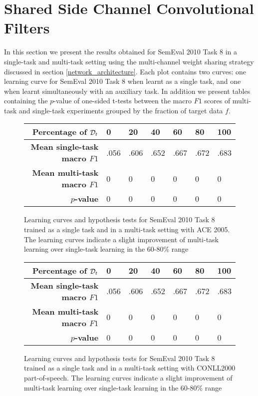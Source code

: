 \section{Shared Side Channel Convolutional Filters}
In this section we present the results obtained for SemEval 2010 Task 8 in a single-task and multi-task setting using the multi-channel weight sharing strategy discussed in section \ref{network_architecture}. Each plot contains two curves: one learning curve for SemEval 2010 Task 8 when learnt as a single task, and one when learnt simultaneously with an auxiliary task. In addition we present tables containing the $p$-value of one-sided t-tests between the macro $F1$ scores of multi-task and single-task experiments grouped by the fraction of target data $f$.
\vspace{2cm}
\begin{figure}[h]
	\centering
	
	
	\vspace*{1cm}
	
	\begin{tabular}{r | l | l | l | l | l | l}
		\textbf{Percentage of $\mathcal{D}_t$} & 0 & 20 & 40 & 60 & 80 & 100 \\  \hline
		\textbf{Mean single-task macro $F1$} & .056 & .606 & .652 & .667 & .672 & .683\\
		\textbf{Mean multi-task macro $F1$} & 0 & 0 & 0 & 0 & 0 & 0\\
		$p$\textbf{-value} & 0 & 0 & 0 & 0 & 0 & 0
	\end{tabular}
	\caption{Learning curves and hypothesis tests for SemEval 2010 Task 8 trained as a single task and in a multi-task setting with ACE 2005. The learning curves indicate a slight improvement of multi-task learning over single-task learning in the 60-80\% range}
\end{figure}
\begin{figure}
	\centering
	
	\vspace*{1cm}
	
	\begin{tabular}{r | l | l | l | l | l | l}
		\textbf{Percentage of $\mathcal{D}_t$} & 0 & 20 & 40 & 60 & 80 & 100 \\  \hline
		\textbf{Mean single-task macro $F1$} & .056 & .606 & .652 & .667 & .672 & .683\\
		\textbf{Mean multi-task macro $F1$} & 0 & 0 & 0 & 0 & 0 & 0\\
		$p$\textbf{-value} & 0 & 0 & 0 & 0 & 0 & 0
	\end{tabular}
	\caption{Learning curves and hypothesis tests for SemEval 2010 Task 8 trained as a single task and in a multi-task setting with CONLL2000 part-of-speech. The learning curves indicate a slight improvement of multi-task learning over single-task learning in the 60-80\% range}
\end{figure}
